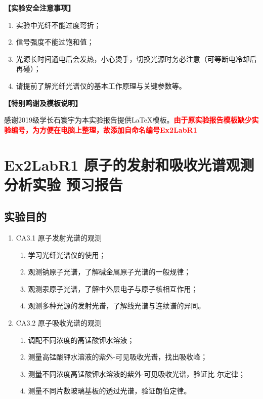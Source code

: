 \documentclass[dvipsnames, svgnames,a4paper,11pt]{article}
\begin{document}
	\textbf{【实验安全注意事项】}	
	\begin{enumerate}
		\item 实验中光纤不能过度弯折；
		\item 信号强度不能过饱和值；
		\item 光源长时间通电后会发热，小心烫手，切换光源时务必注意（可等断电冷却后再碰）；
		\item 请提前了解光纤光谱仪的基本工作原理与关键参数等。		
	\end{enumerate}
	
	
	\textbf{【特别鸣谢及模板说明】}	
	
	感谢2019级学长石寰宇为本实验报告提供\LaTeX 模板。\textcolor{red}{\textbf{由于原实验报告模板缺少实验编号，为方便在电脑上整理，故添加自命名编号Ex2LabR1}}
	
	
	
	\clearpage
	\tableofcontents
	\clearpage
	
	
	
	
	\setcounter{section}{0}
	\section{Ex2LabR1 原子的发射和吸收光谱观测分析实验 \quad\heiti 预习报告}
	
	\subsection{实验目的}
	\begin{enumerate}
		\item CA3.1 原子发射光谱的观测
		\begin{enumerate}
			\item 学习光纤光谱仪的使用；
			\item 观测钠原子光谱，了解碱金属原子光谱的一般规律；
			\item 观测汞原子光谱，了解中外层电子与原子核相互作用；
			\item 观测多种光源的发射光谱，了解线光谱与连续谱的异同。
		\end{enumerate}
		
		\item CA3.2 原子吸收光谱的观测
		\begin{enumerate}
			\item 调配不同浓度的高锰酸钾水溶液；
			\item 测量高锰酸钾水溶液的紫外-可见吸收光谱，找出吸收峰；
			\item 测量不同浓度高锰酸钾水溶液的紫外-可见吸收光谱，验证比
			尔定律；
			\item 测量不同片数玻璃基板的透过光谱，验证朗伯定律。
		\end{enumerate}
	\end{enumerate}
	
\end{document}
